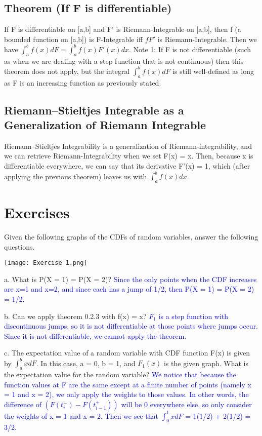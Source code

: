 \documentclass{report}
\begin{document}
\subsection{Theorem (If F is differentiable)}
If F is differentiable on [a,b] and F' is Riemann-Integrable on [a,b], 
then f (a bounded function on [a,b]) is F-Integrable iff $fF'$ is Riemann-Integrable.
Then we have $\int_{a}^{b}f(x)dF = \int_{a}^{b} f(x)F'(x)dx$. 
\newline \newline
Note 1: If F is not differentiable (such as when we are dealing with a step function
that is not continuous) then this theorem does not apply, but the integral $\int_{a}^{b}f(x)dF$
is still well-defined as long as F is an increasing function as previously stated. 

\subsection{Riemann–Stieltjes Integrable as a Generalization of Riemann Integrable}
Riemann–Stieltjes Integrability is a generalization of Riemann-integrability, and we can
retrieve Riemann-Integrability when we set F(x) = x. Then, because x is differentiable everywhere,
we can say that its derivative F'(x) = 1, which (after applying the previous theorem) 
leaves us with $\int_{a}^{b}f(x)dx$.

\section{Exercises}
Given the following graphs of the CDFs of random variables, answer the following 
questions.
\begin{center}
    \texttt{[image: Exercise 1.png]}
\end{center}
a. What is P(X = 1) = P(X = 2)? \newline
\textcolor{blue}{Since the only points when the CDF increases are x=1 and x=2, and since each has a 
jump of 1/2, then P(X = 1) = P(X = 2) = 1/2.} \newline

b. Can we apply theorem 0.2.3 with f(x) = x? \newline
\textcolor{blue}{$F_1$ is a step function with discontinuous jumps, so it is 
not differentiable at those points where jumps occur. Since it is not 
differentiable, we cannot apply the theorem.} \newline

c. The expectation value of a random variable with CDF function F(x) is 
given by $\int_{a}^{b}xdF$. In this case, a = 0, b = 1, and $F_1(x)$ is the 
given graph. What is the expectation value for the random variable?
\textcolor{blue}{We notice that because the function values at F are the same except
at a finite number of points (namely x = 1 and x = 2), we only apply the weights to those values. 
In other words, the difference of $(F(t_i^-) - F(t_{i-1}^+))$ will be 0 everywhere else, so only 
consider the weights of x = 1 and x = 2. Then we see that $\int_{0}^{1}xdF$ = 1(1/2) + 2(1/2) = 3/2.} \newline
\end{document}
